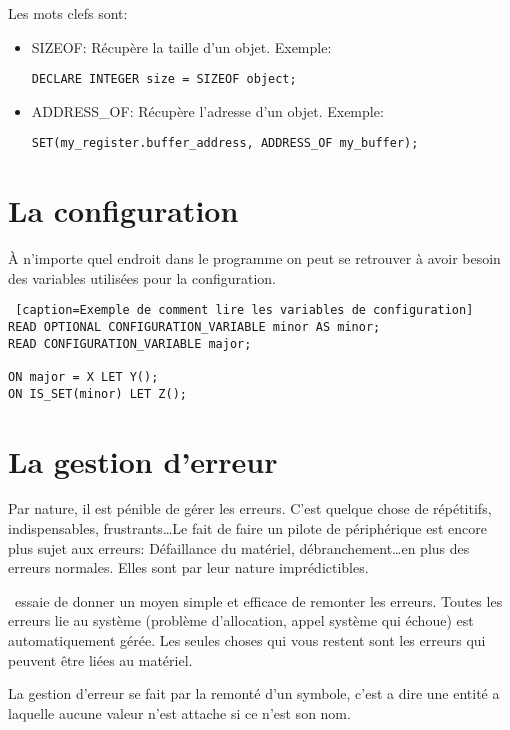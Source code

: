\documentclass{rtxreport}
\begin{document}
Les mots clefs sont:
\begin{itemize}
	\item SIZEOF: Récupère la taille d'un objet. Exemple:
	\begin{lstlisting}[caption=Exemple du sizeof]
		DECLARE INTEGER size = SIZEOF object;
	\end{lstlisting}

	\item ADDRESS\_OF: Récupère l'adresse d'un objet. Exemple:
	\begin{lstlisting}[caption=Exemple du sizeof]
		SET(my_register.buffer_address, ADDRESS_OF my_buffer);
	\end{lstlisting}
\end{itemize}

\section{La configuration}

À n’importe quel endroit dans le programme on peut se retrouver à avoir besoin
des variables utilisées pour la configuration. 

\begin{lstlisting} [caption=Exemple de comment lire les variables de configuration]
READ OPTIONAL CONFIGURATION_VARIABLE minor AS minor;
READ CONFIGURATION_VARIABLE major;

ON major = X LET Y();
ON IS_SET(minor) LET Z();
\end{lstlisting}

\section{La gestion d'erreur}


Par nature, il est pénible de gérer les erreurs. C'est quelque chose de
répétitifs, indispensables, frustrants\ldots Le fait de faire un pilote de
périphérique est encore plus sujet aux erreurs: Défaillance du matériel,
débranchement\ldots en plus des erreurs normales.  Elles sont par leur nature
imprédictibles.

\rtx\  essaie de donner un moyen simple et efficace de remonter les erreurs.
Toutes les erreurs lie au système (problème d'allocation, appel système qui
échoue) est automatiquement gérée. Les seules choses qui vous restent sont les
erreurs qui peuvent être liées au matériel.

La gestion d'erreur se fait par la remonté d'un symbole, c'est a dire une
entité a laquelle aucune valeur n'est attache si ce n'est son nom.
\end{document}
